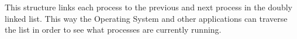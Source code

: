 \documentclass[a4paper]{article}
\begin{document}
This structure links each process to the previous and next process in the doubly linked list. 
This way the Operating System and other applications can traverse the list in order to see what processes are currently running. \\
%
%

\newpage
\end{document}
